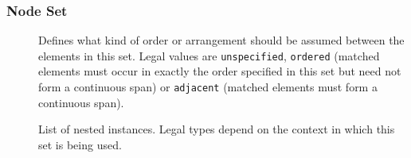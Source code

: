 \documentclass[11pt,a4paper]{article}
\begin{document}
\subsubsection{Node Set}
\label{sec:json-ld-node-set}
\begin{attributes}{}
\end{attributes}
\begin{description}
	\item[] Defines what kind of order or arrangement should be assumed between the elements in this set. Legal values are \texttt{unspecified}, \texttt{ordered} (matched elements must occur in exactly the order specified in this set but need not form a continuous span) or \texttt{adjacent} (matched elements must form a continuous span).
\end{description}
\begin{elements}{}
\end{elements}
\begin{description}
	\item[] List of nested  instances. Legal types depend on the context in which this set is being used.
\end{description}

\end{document}
